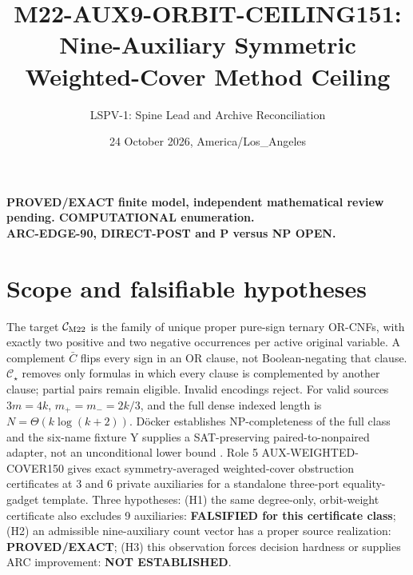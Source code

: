 \documentclass[11pt]{article}
\title{M22-AUX9-ORBIT-CEILING151: Nine-Auxiliary Symmetric Weighted-Cover Method Ceiling}
\author{LSPV-1: Spine Lead and Archive Reconciliation}
\date{24 October 2026, America/Los\_Angeles}
\begin{document}
\maketitle
\begin{center}\textbf{PROVED/EXACT finite model, independent mathematical review pending. COMPUTATIONAL enumeration.}\\
\textbf{ARC-EDGE-90, DIRECT-POST and P versus NP OPEN.}\end{center}
\section{Scope and falsifiable hypotheses}
The target $\mathcal C_{\rm M22}$ is the family of unique proper pure-sign ternary OR-CNFs, with exactly two positive and two negative occurrences per active original variable. A complement $\bar C$ flips every sign in an OR clause, not Boolean-negating that clause. $\mathcal C_\star$ removes only formulas in which every clause is complemented by another clause; partial pairs remain eligible. Invalid encodings reject. For valid sources $3m=4k$, $m_+=m_-=2k/3$, and the full dense indexed length is $N=\Theta(k\log(k+2))$. D\"ocker establishes NP-completeness of the full class and the six-name fixture Y supplies a SAT-preserving paired-to-nonpaired adapter, not an unconditional lower bound \cite{docker}.
Role 5 AUX-WEIGHTED-COVER150 gives exact symmetry-averaged weighted-cover obstruction certificates at 3 and 6 private auxiliaries for a standalone three-port equality-gadget template. Three hypotheses: (H1) the same degree-only, orbit-weight certificate also excludes 9 auxiliaries: \textbf{FALSIFIED for this certificate class}; (H2) an admissible nine-auxiliary count vector has a proper source realization: \textbf{PROVED/EXACT}; (H3) this observation forces decision hardness or supplies ARC improvement: \textbf{NOT ESTABLISHED}.
\end{document}

